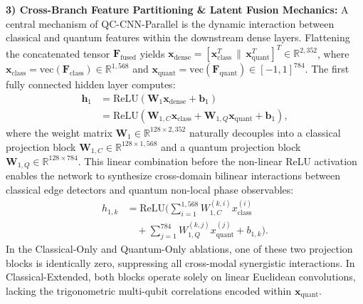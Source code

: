 \documentclass[pdflatex,sn-mathphys-num]{sn-jnl}%
\theoremstyle{thmstyleone}%
\theoremstyle{thmstyletwo}%
\theoremstyle{thmstylethree}%
\begin{document}
\textbf{3) Cross-Branch Feature Partitioning \& Latent Fusion Mechanics:}
A central mechanism of QC-CNN-Parallel is the dynamic interaction between classical and quantum features within the downstream dense layers. Flattening the concatenated tensor $\mathbf{F}_{\mathrm{fused}}$ yields $\mathbf{x}_{\mathrm{dense}} = [\mathbf{x}_{\mathrm{class}}^T \,\|\, \mathbf{x}_{\mathrm{quant}}^T]^T \in \mathbb{R}^{2{,}352}$, where $\mathbf{x}_{\mathrm{class}} = \mathrm{vec}(\mathbf{F}_{\mathrm{class}}) \in \mathbb{R}^{1{,}568}$ and $\mathbf{x}_{\mathrm{quant}} = \mathrm{vec}(\mathbf{F}_{\mathrm{quant}}) \in [-1, 1]^{784}$. The first fully connected hidden layer computes:
\begin{align}
\mathbf{h}_1 &= \mathrm{ReLU}\left( \mathbf{W}_1 \mathbf{x}_{\mathrm{dense}} + \mathbf{b}_1 \right) \nonumber \\
&= \mathrm{ReLU}\left( \mathbf{W}_{1,C} \mathbf{x}_{\mathrm{class}} + \mathbf{W}_{1,Q} \mathbf{x}_{\mathrm{quant}} + \mathbf{b}_1 \right),
\label{eq:ablation_dense_partition}
\end{align}
where the weight matrix $\mathbf{W}_1 \in \mathbb{R}^{128 \times 2{,}352}$ naturally decouples into a classical projection block $\mathbf{W}_{1,C} \in \mathbb{R}^{128 \times 1{,}568}$ and a quantum projection block $\mathbf{W}_{1,Q} \in \mathbb{R}^{128 \times 784}$. This linear combination before the non-linear ReLU activation enables the network to synthesize cross-domain bilinear interactions between classical edge detectors and quantum non-local phase observables:
\begin{align}
h_{1,k} &= \mathrm{ReLU}\Bigg( \sum_{i=1}^{1{,}568} W_{1,C}^{(k,i)} x_{\mathrm{class}}^{(i)} \nonumber \\
&\quad + \sum_{j=1}^{784} W_{1,Q}^{(k,j)} x_{\mathrm{quant}}^{(j)} + b_{1,k} \Bigg).
\label{eq:neuron_level_fusion}
\end{align}
In the Classical-Only and Quantum-Only ablations, one of these two projection blocks is identically zero, suppressing all cross-modal synergistic interactions. In Classical-Extended, both blocks operate solely on linear Euclidean convolutions, lacking the trigonometric multi-qubit correlations encoded within $\mathbf{x}_{\mathrm{quant}}$.
\end{document}
